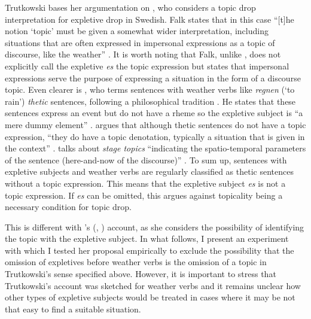 Trutkowski bases her argumentation on \citet{falk1993}, who considers a topic drop interpretation for expletive  drop in Swedish. 
Falk states that in this case ``[t]he notion `topic' must be given a somewhat wider interpretation, including situations that are often expressed in impersonal expressions as a topic of discourse, like the weather'' \citep[172]{falk1993}.
It is worth noting that Falk, unlike \citet{trutkowski2011, trutkowski2016}, does not explicitly call the expletive \textit{es} the topic expression but states that impersonal expressions serve the purpose of expressing a situation in the form of a discourse topic. 
Even clearer is \citet{firbas1982}, who terms sentences with weather verbs like \textit{regnen} (`to rain') \textit{thetic} sentences, following a philosophical tradition \citep[see, e.g.,][]{ulrich1986}.
He states that these sentences express an event but do not have a rheme so the expletive  subject is ``a mere dummy element'' \citep[105]{firbas1982}.
\citet{krifka2007} argues that although thetic sentences do not have a topic expression, ``they do have a topic denotation, typically a situation that is given in the context'' \citep[43]{krifka2007}.
\citet{erteschik-shir1997, erteschik-shir2007} talks about \textit{stage topics} ``indicating the spatio-temporal parameters of the sentence (here-and-now of the discourse)'' \citep[16]{erteschik-shir2007}.
To sum up, sentences with expletive subjects and weather verbs are regularly classified as thetic sentences without a topic expression.
This means that the expletive subject \textit{es} is not a topic expression.
If \textit{es} can be omitted, this argues against topicality being a necessary condition for topic drop.

This is different with \citeauthor{trutkowski2016}'s (\citeyear{trutkowski2011}, \citeyear{trutkowski2016})  account, as she considers the possibility of identifying the topic with the expletive  subject.
In what follows, I present an experiment with which I tested her proposal empirically to exclude the possibility that the omission of expletives before weather verbs is the omission of a topic in Trutkowski's sense specified above.
However, it is important to stress that Trutkowski's account was sketched for weather verbs and it remains unclear how other types of expletive  subjects would be treated in cases where it may be not that easy to find a suitable situation.

\setcounter{expcounter}{0}
\label{exp:ex}
